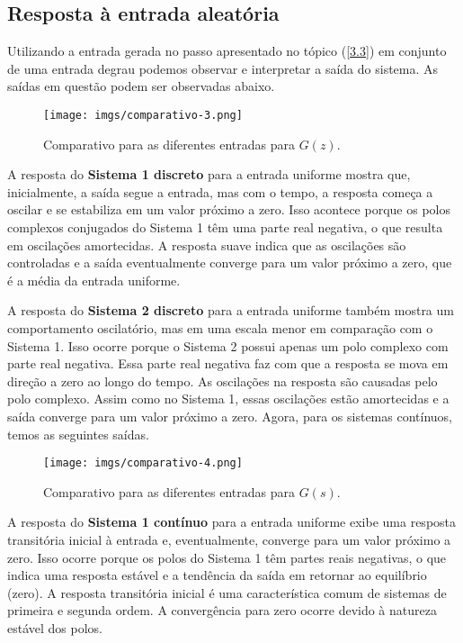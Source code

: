 \documentclass[a4paper,12pt]{article}
\begin{document}
\subsection{Resposta à entrada aleatória}\label{4.3}

Utilizando a entrada gerada no passo apresentado no tópico (\ref{3.3}) em conjunto de uma entrada degrau podemos observar e interpretar a saída do sistema. As saídas em questão podem ser observadas abaixo. 

\begin{figure}[h!]\label{fig4}
  \centering
  \texttt{[image: imgs/comparativo-3.png]}
  \caption{Comparativo para as diferentes entradas para $G(z)$.}
\end{figure}

A resposta do \textbf{Sistema 1 discreto} para a entrada uniforme mostra que, inicialmente, a saída segue a entrada, mas com o tempo, a resposta começa a oscilar e se estabiliza em um valor próximo a zero. Isso acontece porque os polos complexos conjugados do Sistema 1 têm uma parte real negativa, o que resulta em oscilações amortecidas. A resposta suave indica que as oscilações são controladas e a saída eventualmente converge para um valor próximo a zero, que é a média da entrada uniforme.

A resposta do \textbf{Sistema 2 discreto} para a entrada uniforme também mostra um comportamento oscilatório, mas em uma escala menor em comparação com o Sistema 1. Isso ocorre porque o Sistema 2 possui apenas um polo complexo com parte real negativa. Essa parte real negativa faz com que a resposta se mova em direção a zero ao longo do tempo. As oscilações na resposta são causadas pelo polo complexo. Assim como no Sistema 1, essas oscilações estão amortecidas e a saída converge para um valor próximo a zero. Agora, para os sistemas contínuos, temos as seguintes saídas.

\begin{figure}[h!]\label{fig5}
  \centering
  \texttt{[image: imgs/comparativo-4.png]}
  \caption{Comparativo para as diferentes entradas para $G(s)$.}
\end{figure}

A resposta do \textbf{Sistema 1 contínuo} para a entrada uniforme exibe uma resposta transitória inicial à entrada e, eventualmente, converge para um valor próximo a zero. Isso ocorre porque os polos do Sistema 1 têm partes reais negativas, o que indica uma resposta estável e a tendência da saída em retornar ao equilíbrio (zero). A resposta transitória inicial é uma característica comum de sistemas de primeira e segunda ordem. A convergência para zero ocorre devido à natureza estável dos polos.
\end{document}
